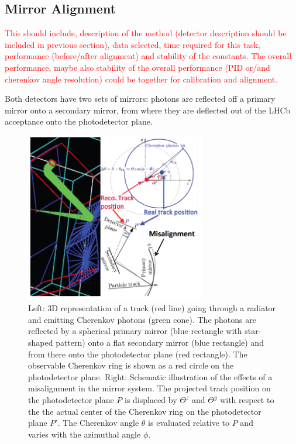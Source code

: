 \subsection{\rich Mirror Alignment}
\textcolor{red}{This should include, description of the method (detector description
should be included in previous section), data selected, time required 
for this task, performance (before/after alignment) and stability of the constants. 
The overall performance, maybe also stability of the overall performance (PID 
or/and cherenkov angle resolution) could be together for calibration and alignment.}



Both \rich detectors have two sets of mirrors: photons are reflected off a
primary mirror onto a secondary mirror, from where they are deflected out of the
LHCb acceptance onto the photodetector plane.
\begin{figure}[h]
\begin{center}
\includegraphics[width=0.7\textwidth]{../figures/RichMissAlign.png}
\caption{\label{fig:RichMissAlign} Left: 3D representation of a track (red line) going through a radiator and emitting Cherenkov photons (green cone). The photons are reflected by a spherical primary mirror (blue rectangle with star-shaped pattern) onto a flat secondary mirror (blue rectangle) and from there onto the photodetector plane (red rectangle). The observable Cherenkov ring is shown as a red circle on the photodetector plane. Right: Schematic illustration of the effects of a misalignment in the \rich mirror system. The projected track position on the photodetector plane $P$ is displaced by $\varTheta^z$ and $\varTheta^y$ with respect to the the actual center of the Cherenkov ring on the photodetector plane $P'$. The Cherenkov angle $\theta$ is evaluated relative to $P$ and varies with the azimuthal angle $\phi$.}
\end{center}
\end{figure}

